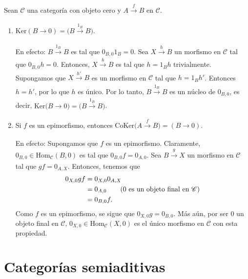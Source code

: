 \documentclass[tesis]{subfiles}
\begin{document}
\begin{Obs}\label{Obs: pares núcleo-conúcleo triviales} %
    Sean $\mathscr{C}$ una categoría con objeto cero y $A\xrightarrow[]{f} B$ en $\mathscr{C}$.

    \begin{enumerate}[label=(\arabic*)]
    
        \item $\text{Ker}(B\to 0) = \big(B\xrightarrow[]{1_B}B\big)$.
            
            En efecto: $B\xrightarrow[]{1_B}B$ es tal que $0_{B,0}1_B=0$. Sea $X\xrightarrow[]{h} B$ un morfismo en $\mathscr{C}$ tal que $0_{B,0}h=0$. Entonces, $X\xrightarrow[]{h} B$ es tal que $h=1_Bh$ trivialmente. Supongamos que $X\xrightarrow[]{h'} B$ es un morfismo en $\mathscr{C}$ tal que $h=1_Bh'$. Entonces $h=h'$, por lo que $h$ es único. Por lo tanto, $B\xrightarrow[]{1_B}B$ es un núcleo de $0_{B,0}$, es decir, $\text{Ker}\big(B\xrightarrow[]{}0\big) = \big(B\xrightarrow[]{1_B}B\big)$.

        \item Si $f$ es un epimorfismo, entonces $\text{CoKer}\big(A\xrightarrow[]{f} B\big) = (B\to 0)$.

            En efecto: Supongamos que $f$ es un epimorfismo. Claramente, $0_{B,0}\in\text{Hom}_\mathscr{C}(B,0)$ es tal que $0_{B,0}f=0_{A,0}$. Sea $B\xrightarrow[]{g} X$ un morfismo en $\mathscr{C}$ tal que $gf=0_{A,X}$. Entonces, tenemos que
            \begin{align*}
                0_{X,0}gf &= 0_{X,0}0_{A,X} \\
                         &= 0_{A,0} \tag{$0$ es un objeto final en $\mathscr{C}$} \\
                         &= 0_{B,0}f.
            \end{align*}
            Como $f$ es un epimorfismo, se sigue que $0_{X,0}g = 0_{B,0}$. Más aún, por ser $0$ un objeto final en $\mathscr{C}$, $0_{X,0}\in\text{Hom}_\mathscr{C}(X,0)$ es el único morfismo en $\mathscr{C}$ con esta propiedad.
    \end{enumerate}
\end{Obs}

\section{Categorías semiaditivas} \label{Sec: Categorías semiaditivas}
\end{document}
